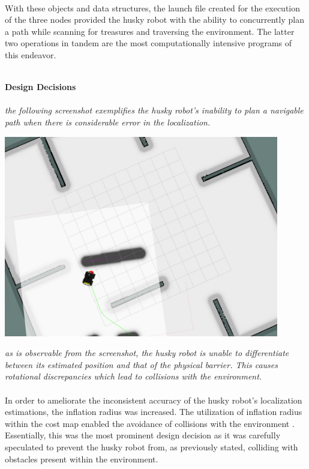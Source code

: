 \documentclass[12pt]{article}
\begin{document}
{  \paragraph{}With these objects and data structures, the launch file created for the execution of the three nodes provided the husky robot with the ability to concurrently plan a path while scanning for treasures and traversing the environment. The latter two operations in tandem are the most computationally intensive programs of this endeavor. 
  \\\\
}
{\setlength{\parindent}{0cm}
\textbf{Design Decisions} 
\\\\ \textit{the following screenshot exemplifies the husky robot's inability to plan a navigable path when there is considerable error in the localization.} 
\begin{center} \includegraphics[width=120mm]{RViz1.png} \end{center}
\textit{as is observable from the screenshot, the husky robot is unable to differentiate between its estimated position and that of the physical barrier. This causes rotational discrepancies which lead to collisions with the environment.}
\paragraph{} In order to ameliorate the inconsistent accuracy of the husky robot's localization estimations, the inflation radius was increased. 
  The utilization of inflation radius within the cost map enabled the avoidance of collisions with the environment . Essentially, this was the most prominent design decision as it was carefully speculated to prevent the husky robot from, as previously stated, colliding with obstacles present within the environment.   
\\\\\\\\\\  
}
\end{document}
